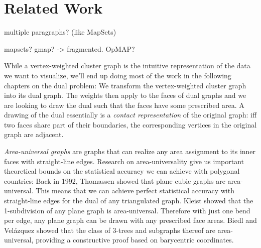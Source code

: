 \section{Related Work}
\label{sect:related-work}

\cite{lee2006mental}
\cite{lewandowsky1993perception}
\cite{kobourov2012putting}
\cite{purchase2008extremes}
\cite{purchase2006important}
\cite{saket2015map}
\cite{efrat2014mapsets}

multiple paragraphs? (like MapSets)

mapsets?
gmap? -> fragmented.
OpMAP?



While a vertex-weighted cluster graph is the intuitive representation of the data we want to visualize, we'll end up doing most of the work in the following chapters on the dual problem: We transform the vertex-weighted cluster graph into its dual graph. The weights then apply to the faces of dual graphs and we are looking to draw the dual such that the faces have some prescribed area. A drawing of the dual essentially is a \emph{contact representation} of the original graph: iff two faces share part of their boundaries, the corresponding vertices in the original graph are adjacent.

\emph{Area-universal graphs} are graphs that can realize any area assignment to its inner faces with straight-line edges. Research on area-universality give us important theoretical bounds on the statistical accuracy we can achieve with polygonal countries: Back in 1992, Thomassen \cite{thomassen1992plane} showed that plane cubic graphs are area-universal. This means that we can achieve perfect statistical accuracy with straight-line edges for the dual of any triangulated graph. Kleist \cite{kleist2018drawing} \cite{kleist2019planar} showed that the 1-subdivision of any plane graph is area-universal. Therefore with just one bend per edge, any plane graph can be drawn with any prescribed face areas. Biedl and Velázquez \cite{biedl2013drawing} showed that the class of 3-trees and subgraphs thereof are area-universal, providing a constructive proof based on barycentric coordinates.

